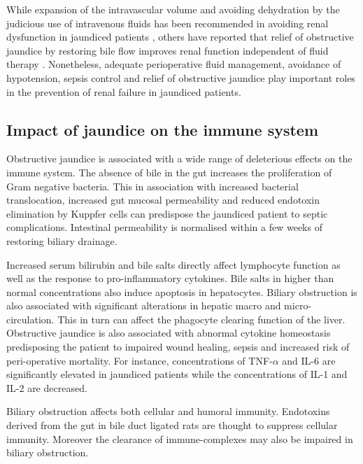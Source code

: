 While expansion of the intravascular volume and avoiding dehydration by the judicious use of intravenous fluids has been recommended in avoiding renal dysfunction in jaundiced patients \parencite{parks_prospective_1994}, others have reported that relief of obstructive jaundice by restoring bile flow improves renal function independent of fluid therapy \parencite{padillo_randomized_2005}. 
Nonetheless, adequate perioperative fluid management, avoidance of hypotension, sepsis control and relief of obstructive jaundice play important roles in the prevention of renal failure in jaundiced patients.

\subsection{Impact of jaundice on the immune system}

Obstructive jaundice is associated with a wide range of deleterious effects on the immune system. 
The absence of bile in the gut increases the proliferation of Gram negative bacteria. 
This in association with increased bacterial translocation, increased gut mucosal permeability and reduced endotoxin elimination by Kuppfer cells can predispose the jaundiced patient to septic complications. 
Intestinal permeability is normalised within a few weeks of restoring biliary drainage.

Increased serum bilirubin and bile salts directly affect lymphocyte function as well as the response to pro-inflammatory cytokines. 
Bile salts in higher than normal concentrations also induce apoptosis in hepatocytes. 
Biliary obstruction is also associated with significant alterations in hepatic macro and micro-circulation. 
This in turn can affect the phagocyte clearing function of the liver. 
Obstructive jaundice is also associated with abnormal cytokine homeostasis predisposing the patient to impaired wound healing, sepsis and increased risk of peri-operative mortality. 
For instance, concentrations of TNF-$\alpha$ and IL-6 are significantly elevated in jaundiced patients while the concentrations of IL-1 and IL-2 are decreased. 

Biliary obstruction affects both cellular and humoral immunity. 
Endotoxins derived from the gut in bile duct ligated rats are thought to suppress cellular immunity. 
Moreover the clearance of immune-complexes may also be impaired in biliary obstruction.


